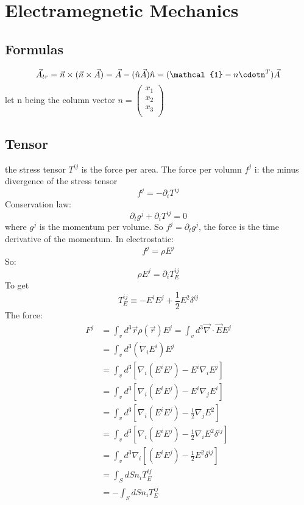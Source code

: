 \chapter{Electramegnetic Mechanics}

\section{Formulas}
\[
    \vec{A}_{tr} = \vec{n}\times(\vec{n}\times\vec{A}) = \vec{A}-(\hat{n}\vec{A})\hat{n} = (\mathcal{1}-n\cdotn^T)\vec{A}
\]
let n being the column vector 
$n=\begin{pmatrix}
    x_1	\\
    x_2	\\
    x_3	\\
\end{pmatrix}$

\section{Tensor}
the stress tensor $T^{ij}$ is the force per area. The force per volumn $f^j$
i: the minus divergence of the stress tensor
\[ f^j = -\partial_iT^{ij} \]
Conservation law:
\[  \partial_tg^j+\partial_iT^{ij} = 0 \]
where $g^j$ is the momentum per volume. So $f^j=\partial_tg^j$, the force is
the time derivative of the momentum.
In electrostatic:
\[  f^j = \rho E^j \]
So:
\[  \rho E^j = \partial_iT_E^{ij} \]
To get 
\[  T_E^{ij} \equiv -E^iE^j + \frac{1}{2}E^2\delta^{ij} \]
The force:
\begin{equation*}
\begin{aligned}  
    F^j &= \int_v d^3\vec{r}\rho(\vec{r})E^j = \int_v d^3\vec{\nabla}\cdot\vec{E}E^j	\\
	&= \int_v d^3(\nabla_iE^i)E^j \\
	&= \int_v d^3 [\nabla_i(E^iE^j) - E^i\nabla_iE^j ] \\
	&= \int_v d^3 [\nabla_i(E^iE^j) - E^i\nabla_jE^i ] \\
	&= \int_v d^3 [\nabla_i(E^iE^j) - \frac{1}{2}\nabla_jE^2 ] \\
	&= \int_v d^3 [\nabla_i(E^iE^j) - \frac{1}{2}\nabla_iE^2\delta^{ij} ] \\
	&= \int_v d^3 \nabla_i [(E^iE^j) - \frac{1}{2}E^2\delta^{ij} ] \\
	&= \int_S dS n_i T_E^{ij} \\
	&= -\int_S dS n_i T_E^{ij} 
\end{aligned}  
\end{equation*}

